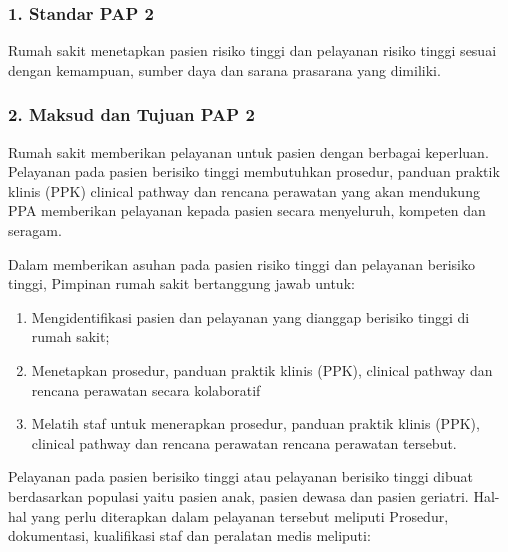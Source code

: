 \documentclass[
]{book}
\providecommand{\tightlist}{%
  \setlength{\itemsep}{0pt}\setlength{\parskip}{0pt}}
\begin{document}
\hypertarget{standar-pap-2}{%
\subsubsection*{1. Standar PAP 2}\label{standar-pap-2}}

Rumah sakit menetapkan pasien risiko tinggi dan pelayanan risiko tinggi sesuai dengan kemampuan, sumber daya dan sarana prasarana yang dimiliki.

\hypertarget{maksud-dan-tujuan-pap-2}{%
\subsubsection*{2. Maksud dan Tujuan PAP 2}\label{maksud-dan-tujuan-pap-2}}

Rumah sakit memberikan pelayanan untuk pasien dengan berbagai keperluan. Pelayanan pada pasien berisiko tinggi membutuhkan prosedur, panduan praktik klinis (PPK) clinical pathway dan rencana perawatan yang akan mendukung PPA memberikan pelayanan kepada pasien secara menyeluruh, kompeten dan seragam.

Dalam memberikan asuhan pada pasien risiko tinggi dan pelayanan berisiko tinggi, Pimpinan rumah sakit bertanggung jawab untuk:

\begin{enumerate}
\def\labelenumi{\alph{enumi}.}
\tightlist
\item
  Mengidentifikasi pasien dan pelayanan yang dianggap berisiko tinggi di rumah sakit;
\item
  Menetapkan prosedur, panduan praktik klinis (PPK), clinical pathway dan rencana perawatan secara kolaboratif
\item
  Melatih staf untuk menerapkan prosedur, panduan praktik klinis (PPK), clinical pathway dan rencana perawatan rencana perawatan tersebut.
\end{enumerate}

Pelayanan pada pasien berisiko tinggi atau pelayanan berisiko tinggi dibuat berdasarkan populasi yaitu pasien anak, pasien dewasa dan pasien geriatri. Hal-hal yang perlu diterapkan dalam pelayanan tersebut meliputi Prosedur, dokumentasi, kualifikasi staf dan peralatan medis meliputi:
\end{document}
